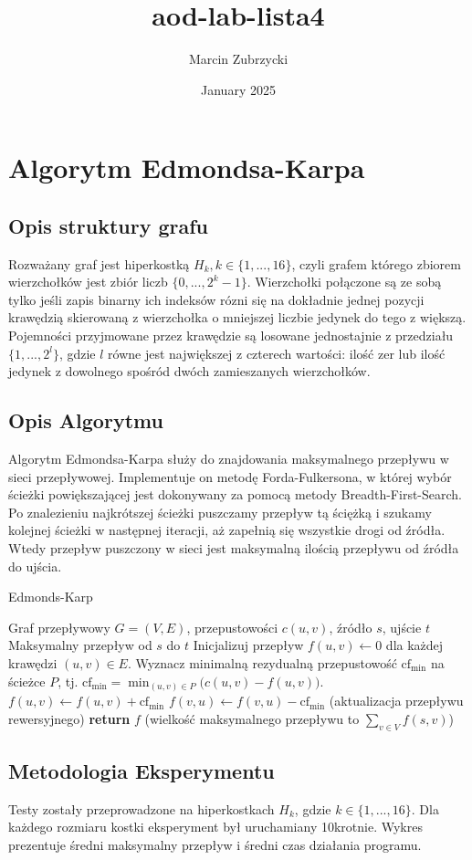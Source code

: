 \documentclass{article}
\title{aod-lab-lista4}
\author{Marcin Zubrzycki}
\date{January 2025}
\begin{document}
\maketitle


\section*{Algorytm Edmondsa-Karpa}
\subsection*{Opis struktury grafu}
Rozważany graf jest hiperkostką $H_k, k\in \{1,...,16\}$, czyli grafem którego zbiorem wierzchołków jest zbiór liczb $\{0,...,2^{k}-1\}$. Wierzchołki połączone są ze sobą tylko jeśli zapis binarny ich indeksów rózni się na dokładnie jednej pozycji krawędzią skierowaną z wierzchołka o mniejszej liczbie jedynek do tego z większą. Pojemności przyjmowane przez krawędzie są losowane jednostajnie z przedziału $\{1,...,2^l\}$, gdzie $l$ równe jest największej z czterech wartości: ilość zer lub ilość jedynek z dowolnego spośród dwóch zamieszanych wierzchołków.
\subsection*{Opis Algorytmu}
Algorytm Edmondsa-Karpa służy do znajdowania maksymalnego przepływu w sieci przepływowej. Implementuje on metodę Forda-Fulkersona, w której wybór ścieżki powiększającej jest dokonywany za pomocą metody Breadth-First-Search. 
Po znalezieniu najkrótszej ścieżki puszczamy przepływ tą ściężką i szukamy kolejnej ścieżki w następnej iteracji, aż zapełnią się wszystkie drogi od źródła. Wtedy przepływ puszczony w sieci jest maksymalną ilością przepływu od źródła do ujścia.
\begin{algorithm}[H]
  \caption{Edmonds-Karp}
  \label{alg:edmonds-karp}
  \begin{algorithmic}[1]
  \REQUIRE Graf przepływowy $G=(V,E)$, przepustowości $c(u,v)$, źródło $s$, ujście $t$
  \ENSURE Maksymalny przepływ od $s$ do $t$
  \STATE Inicjalizuj przepływ $f(u,v) \leftarrow 0$ dla każdej krawędzi $(u,v) \in E$.
    \STATE Wyznacz minimalną rezydualną przepustowość $\text{cf}_{\min}$ na ścieżce $P$, 
           tj. $\text{cf}_{\min} = \min_{(u,v) \in P} \bigl(c(u,v) - f(u,v)\bigr)$.
      \STATE $f(u,v) \leftarrow f(u,v) + \text{cf}_{\min}$ 
      \STATE $f(v,u) \leftarrow f(v,u) - \text{cf}_{\min}$ \quad (aktualizacja przepływu rewersyjnego)
    \ENDFOR
  \ENDWHILE
  \STATE \textbf{return} $f$ \quad (wielkość maksymalnego przepływu to $\sum_{v\in V} f(s,v)$)
  \end{algorithmic}
  \end{algorithm}
\subsection*{Metodologia Eksperymentu}
Testy zostały przeprowadzone na hiperkostkach $H_k$, gdzie $k\in\{1,...,16\}$. Dla każdego rozmiaru kostki eksperyment był uruchamiany 10krotnie. Wykres prezentuje średni maksymalny przepływ i średni czas działania programu. 
\end{document}

